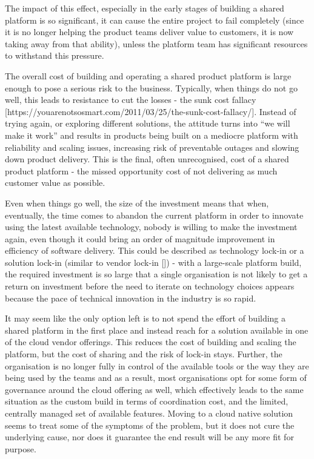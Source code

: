 \documentclass[reprint,amsmath,amssymb,aps]{revtex4-1}
\begin{document}
The impact of this effect, especially in the early stages of building a shared platform is so significant, it can cause the entire project to fail completely (since it is no longer helping the product teams deliver value to customers, it is now taking away from that ability), unless the platform team has significant resources to withstand this pressure.

The overall cost of building and operating a shared product platform is large enough to pose a serious risk to the business. Typically, when things do not go well, this leads to resistance to cut the losses - the sunk cost fallacy [https://youarenotsosmart.com/2011/03/25/the-sunk-cost-fallacy/]. Instead of trying again, or exploring different solutions, the attitude turns into “we will make it work” and results in products being built on a mediocre platform with reliability and scaling issues, increasing risk of preventable outages and slowing down product delivery. This is the final, often unrecognised, cost of a shared product platform - the missed opportunity cost of not delivering as much customer value as possible.

Even when things go well, the size of the investment means that when, eventually, the time comes to abandon the current platform in order to innovate using the latest available technology, nobody is willing to make the investment again, even though it could bring an order of magnitude improvement in efficiency of software delivery. This could be described as technology lock-in or a solution lock-in (similar to vendor lock-in []) - with a large-scale platform build, the required investment is so large that a single organisation is not likely to get a return on investment before the need to iterate on technology choices appears because the pace of technical innovation in the industry is so rapid. 

It may seem like the only option left is to not spend the effort of building a shared platform in the first place and instead reach for a solution available in one of the cloud vendor offerings. This reduces the cost of building and scaling the platform, but the cost of sharing and the risk of lock-in stays. Further, the organisation is no longer fully in control of the available tools or the way they are being used by the teams and as a result, most organisations opt for some form of governance around the cloud offering as well, which effectively leads to the same situation as the custom build in terms of coordination cost, and the limited, centrally managed set of available features. Moving to a cloud native solution seems to treat some of the symptoms of the problem, but it does not cure the underlying cause, nor does it guarantee the end result will be any more fit for purpose.
\end{document}

